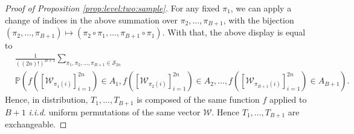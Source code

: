 \documentclass{imsart}
\numberwithin{equation}{section}
\begin{document}
\begin{proof}[Proof of Proposition \ref{prop:level:two:sample}]
	For any fixed $\pi_1$,	we can apply a change of indices in the above summation over $\pi_2,\dots,\pi_{B+1}$, with the bijection $(\pi_2,\ldots,\pi_{B+1}) \mapsto (\pi_2 \circ \pi_1, \ldots, \pi_{B+1} \circ \pi_1)$. With that, the above display is equal to
	\begin{align*}
		&	\frac{1}{ ((2n)!)^{B+1} }
		\sum_{\pi_1, \pi_2,\dots,\pi_{B+1} \in \mathcal{S}_{2n} }
		\\
		&	\mathbb{P} \left( 
		f(  [\mathcal{W}_{ \pi_1(i) }]_{i=1}^{2n} ) \in A_1
		, 
		f(  [\mathcal{W}_{\pi_{2} (i)}]_{i=1}^{2n} ) \in A_2
		,
		\dots, 
		f(  [\mathcal{W}_{\pi_{B+1}  (i)}]_{i=1}^{2n} ) \in A_{B+1}
		\right).
	\end{align*}
	Hence, in distribution, $T_1,\ldots,T_{B+1}$ is composed of the same function $f$ applied to $B+1$ \textit{i.i.d.} uniform permutations of the same vector $\mathcal{W}$. Hence $T_1,\ldots,T_{B+1}$ are exchangeable.
	
	
	

\end{proof}
\end{document}
